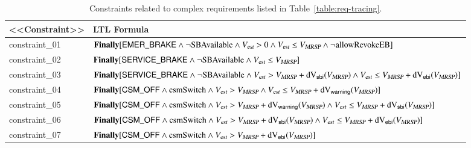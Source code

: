 \begin{table}[htdp]
\caption{Constraints related to complex requirements listed in Table~\ref{table:req-tracing}.}
\begin{center}
\scriptsize
\hspace*{-10mm}
\begin{tabular}{|l|p{12cm}|}
\hline\hline
{\sf <<Constraint>>} & {\bf LTL Formula}
\\\hline\hline
constraint\_01 & 
\parbox{120mm}{
\vspace*{1mm}
$\mathbf{Finally} [\mathsf{EMER\_BRAKE} \wedge \neg \text{SBAvailable} \wedge 
         {V_{\text{\sl est}}} > 0 \wedge {V_{\text{\sl est}}} \le  {V_{\text{\sl MRSP}}} \wedge\neg  \text{allowRevokeEB}]$ 
\vspace*{1mm}         
}
\\\hline
constraint\_02 &  
\parbox{120mm}{
\vspace*{1mm}
$\mathbf{Finally} [\mathsf{SERVICE\_BRAKE} \wedge\neg\text{SBAvailable} \wedge{V_{\text{\sl est}}}\le{V_{\text{\sl MRSP}}}]$
\vspace*{1mm}
}
\\\hline
constraint\_03 &  
\parbox{120mm}{
\vspace*{1mm}
$\mathbf{Finally} [\mathsf{SERVICE\_BRAKE} \wedge\neg\text{SBAvailable}\wedge {V_{\text{\sl est}}} > {V_{\text{\sl MRSP}}} + \text{dV}_{\mathsf{sbi}}({V_{\text{\sl MRSP}}}) \wedge {V_{\text{\sl est}}} \le {V_{\text{\sl MRSP}}} + \text{dV}_{\mathsf{ebi}}({V_{\text{\sl MRSP}}})]$
\vspace*{1mm}
}
\\\hline
constraint\_04 & 
\parbox{120mm}{
\vspace*{1mm}
$\mathbf{Finally} [\mathsf{CSM\_OFF} \wedge \text{csmSwitch} \wedge {V_{\text{\sl est}}} > {V_{\text{\sl MRSP}}}  \wedge {V_{\text{\sl est}}} \le {V_{\text{\sl MRSP}}} + \text{dV}_{\mathsf{warning}}({V_{\text{\sl MRSP}}}) ]$
\vspace*{1mm}
} 
\\\hline
constraint\_05 &
\parbox{120mm}{
\vspace*{1mm}
$\mathbf{Finally} [\mathsf{CSM\_OFF} \wedge\text{csmSwitch} \wedge {V_{\text{\sl est}}} > {V_{\text{\sl MRSP}}} + \text{dV}_{\mathsf{warning}}({V_{\text{\sl MRSP}}}) \wedge {V_{\text{\sl est}}}\le{V_{\text{\sl MRSP}}}+\text{dV}_{\mathsf{sbi}}({V_{\text{\sl MRSP}}}) ]$
\vspace*{1mm}
}  
\\\hline
constraint\_06 & 
\parbox{120mm}{
\vspace*{1mm}
$\mathbf{Finally} [\mathsf{CSM\_OFF} \wedge\text{csmSwitch}\wedge {V_{\text{\sl est}}} > {V_{\text{\sl MRSP}}} + \text{dV}_{\mathsf{sbi}}({V_{\text{\sl MRSP}}}) \wedge {V_{\text{\sl est}}} \le {V_{\text{\sl MRSP}}} + \text{dV}_{\mathsf{ebi}}({V_{\text{\sl MRSP}}}) ]$
\vspace*{1mm}
} 
\\\hline
constraint\_07 &  
\parbox{120mm}{
\vspace*{1mm}
$\mathbf{Finally} [\mathsf{CSM\_OFF} \wedge\text{csmSwitch}\wedge {V_{\text{\sl est}}} > {V_{\text{\sl MRSP}}} + \text{dV}_{\mathsf{ebi}}({V_{\text{\sl MRSP}}}) ]$
\vspace*{1mm}
}
\\\hline

\end{tabular}
\end{center}
\end{table}
